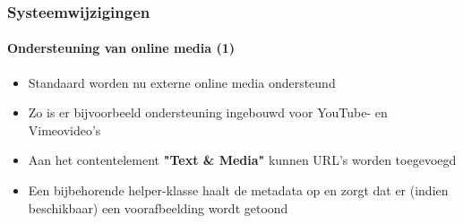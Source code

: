 \begin{frame}[fragile]
	\frametitle{Systeemwijzigingen}
	\framesubtitle{Ondersteuning van online media (1)}

	\begin{itemize}

		\item Standaard worden nu externe online media ondersteund

		\item Zo is er bijvoorbeeld ondersteuning ingebouwd voor YouTube- en Vimeovideo's

		\item Aan het contentelement \textbf{"Text \& Media"} kunnen URL's worden toegevoegd

		\item Een bijbehorende helper-klasse haalt de metadata op en zorgt dat er
			(indien beschikbaar) een voorafbeelding wordt getoond

	\end{itemize}

\end{frame}


